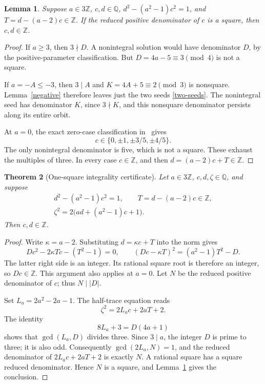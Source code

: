 \documentclass[11pt]{article}
\newtheorem{theorem}{Theorem}
\newtheorem{lemma}[theorem]{Lemma}
\newcommand{\Z}{\mathbb Z}\newcommand{\Q}{\mathbb Q}
\begin{document}
\begin{lemma}\label{square-denominator}
Suppose \(a\in3\Z\), \(c,d\in\Q\),
\(d^2-(a^2-1)c^2=1\), and \(T=d-(a-2)c\in\Z\).
If the reduced positive denominator of \(c\) is a square, then
\(c,d\in\Z\).
\end{lemma}
\begin{proof}
If \(a\ge3\), then \(3\nmid D\). A nonintegral solution
would have denominator \(D\), by the positive-parameter
classification. But \(D=4a-5\equiv3\pmod4\) is not a square.

If \(a=-A\le-3\), then \(3\mid A\) and
\(K=4A+5\equiv2\pmod3\) is nonsquare. Lemma~\ref{negative}
therefore leaves just the two seeds \eqref{two-seeds}. The nonintegral
seed has denominator \(K\), since \(3\nmid K\), and this
nonsquare denominator persists along its entire orbit.

At \(a=0\), the exact zero-case classification in~\cite{Classification}
gives
\[
                  c\in\{0,\pm1,\pm3/5,\pm4/5\}.
\]
The only nonintegral denominator is five, which is not a square.
These exhaust the multiples of three. In every case \(c\in\Z\),
and then \(d=(a-2)c+T\in\Z\).
\end{proof}

\begin{theorem}[One-square integrality certificate]\label{main}
Let \(a\in3\Z\), \(c,d,\zeta\in\Q\), and suppose
\begin{equation}\label{certificate}
 \begin{gathered}
 d^2-(a^2-1)c^2=1,\qquad T=d-(a-2)c\in\Z,\\
 \zeta^2=2\bigl(ad+(a^2-1)c+1\bigr).
 \end{gathered}
\end{equation}
Then \(c,d\in\Z\).
\end{theorem}
\begin{proof}
Write \(\kappa=a-2\). Substituting \(d=\kappa c+T\) into
the norm gives
\[
 Dc^2-2\kappa Tc-(T^2-1)=0,\qquad
 (Dc-\kappa T)^2=(a^2-1)T^2-D.
\]
The latter right side is an integer. Its rational square root is
therefore an integer, so \(Dc\in\Z\). This argument also
applies at \(a=0\). Let \(N\) be the reduced positive denominator
of \(c\); thus \(N\mid|D|\).

Set \(L_a=2a^2-2a-1\). The half-trace equation reads
\[
                      \zeta^2=2L_a c+2aT+2.
\]
The identity
\begin{equation}\label{gcd-identity}
                      8L_a+3=D(4a+1)
\end{equation}
shows that \(\gcd(L_a,D)\) divides three. Since \(3\mid a\),
the integer \(D\) is prime to three; it is also odd. Consequently
\(\gcd(2L_a,N)=1\), and the reduced denominator of
\(2L_a c+2aT+2\) is exactly \(N\). A rational square has a
square reduced denominator. Hence \(N\) is a square, and
Lemma~\ref{square-denominator} gives the conclusion.
\end{proof}
\end{document}
